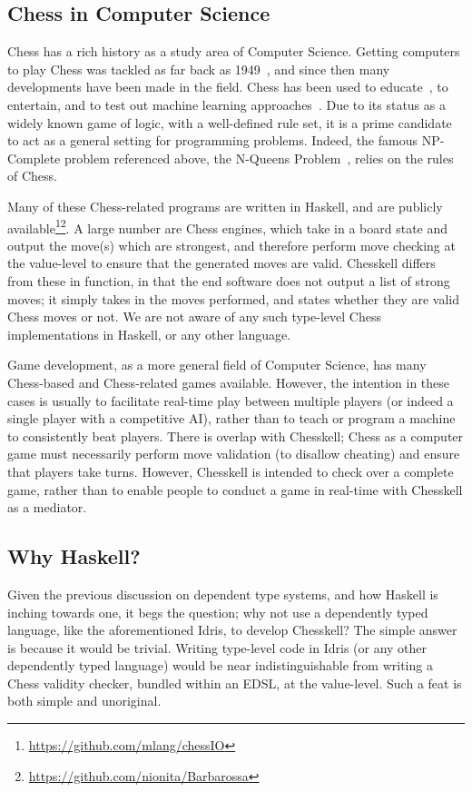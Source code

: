 \subsection{Chess in Computer Science}

Chess has a rich history as a study area of Computer Science. Getting computers to play Chess was tackled as far back as 1949~\cite{1949chess}, and since then many developments have been made in the field. Chess has been used to educate~\cite{chesseducation}, to entertain, and to test out machine learning approaches~\cite{chessml}. Due to its status as a widely known game of logic, with a well-defined rule set, it is a prime candidate to act as a general setting for programming problems. Indeed, the famous NP-Complete problem referenced above, the N-Queens Problem~\cite{nqueensnp}, relies on the rules of Chess.

Many of these Chess-related programs are written in Haskell, and are publicly available\footnote{\url{https://github.com/mlang/chessIO}}\footnote{\url{https://github.com/nionita/Barbarossa}}. A large number are Chess engines, which take in a board state and output the move(s) which are strongest, and therefore perform move checking at the value-level to ensure that the generated moves are valid. Chesskell differs from these in function, in that the end software does not output a list of strong moves; it simply takes in the moves performed, and states whether they are valid Chess moves or not. We are not aware of any such type-level Chess implementations in Haskell, or any other language.

Game development, as a more general field of Computer Science, has many Chess-based and Chess-related games available. However, the intention in these cases is usually to facilitate real-time play between multiple players (or indeed a single player with a competitive AI), rather than to teach or program a machine to consistently beat players. There is overlap with Chesskell; Chess as a computer game must necessarily perform move validation (to disallow cheating) and ensure that players take turns. However, Chesskell is intended to check over a complete game, rather than to enable people to conduct a game in real-time with Chesskell as a mediator.

\subsection{Why Haskell?}

Given the previous discussion on dependent type systems, and how Haskell is inching towards one, it begs the question; why not use a dependently typed language, like the aforementioned Idris, to develop Chesskell? The simple answer is because it would be trivial. Writing type-level code in Idris (or any other dependently typed language) would be near indistinguishable from writing a Chess validity checker, bundled within an EDSL, at the value-level. Such a feat is both simple and unoriginal.

